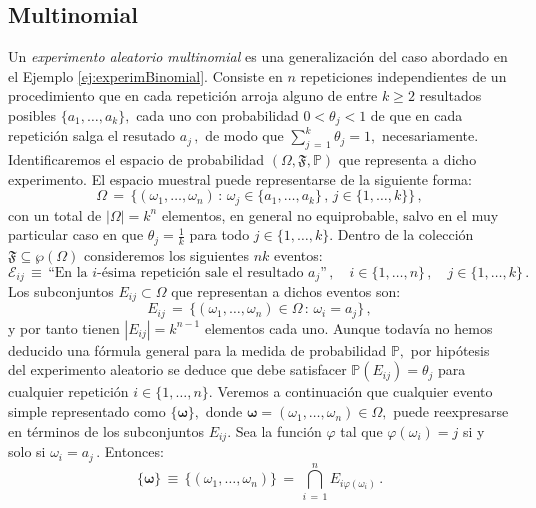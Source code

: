 \documentclass[spanish,10pt,letterpaper]{article}
\newcommand{\prob}{\mathbb{P}}
\begin{document}
\subsection{Multinomial}

Un \textit{experimento aleatorio multinomial} es una generalización del caso abordado en el Ejemplo \ref{ej:experimBinomial}. Consiste en $n$ repeticiones independientes de un procedimiento que en cada repetición arroja alguno de entre $k\geq 2$ resultados posibles $\{a_1,\ldots,a_k\},$ cada uno con probabilidad $0<\theta_j<1$ de que en cada repetición salga el resutado $a_j\,,$ de modo que $\sum_{j\,=\,1}^k\theta_j=1,$ necesariamente. Identificaremos el espacio de probabilidad $(\Omega,\mathfrak{F},\prob)$ que representa a dicho experimento. El espacio muestral puede representarse de la siguiente forma:
\begin{equation}
    \Omega \,=\, \big\{(\omega_1,\ldots,\omega_n)\,:\,\omega_j\in\{a_1,\ldots,a_k\}\,,\,j\in\{1,\ldots,k\}\big\}\,,  
\end{equation}
con un total de $|\Omega|=k^n$ elementos, en general no equiprobable, salvo en el muy particular caso en que $\theta_j=\frac{1}{k}$ para todo $j\in\{1,\ldots,k\}.$ Dentro de la colección $\mathfrak{F}\subseteq\wp(\Omega)$ consideremos los siguientes $nk$ eventos:
\begin{equation}
   \mathcal{E}_{ij} \,\equiv\, \text{``En la $i$-ésima repetición sale el resultado $a_j$''}\,,\quad i\in\{1,\ldots,n\}\,,\quad j\in\{1,\ldots,k\}\,.  
\end{equation}
Los subconjuntos $E_{ij}\subset\Omega$ que representan a dichos eventos son: 
\begin{equation}
  E_{ij} \,=\, \big\{(\omega_1,\ldots,\omega_n)\in \Omega\,:\,\omega_i=a_j\big\}\,,  
\end{equation}
y por tanto tienen $|E_{ij}|=k^{n-1}$ elementos cada uno. Aunque todavía no hemos deducido una fórmula general para la medida de probabilidad $\prob,$ por hipótesis del experimento aleatorio se deduce que debe satisfacer $\prob(E_{ij})=\theta_j$ para cualquier repetición $i\in\{1,\ldots,n\}.$ Veremos a continuación que cualquier evento simple representado como $\{\boldsymbol{\omega}\},$ donde $\boldsymbol{\omega}=(\omega_1,\ldots,\omega_n)\in\Omega,$ puede reexpresarse en términos de los subconjuntos $E_{ij}.$ Sea la función $\varphi$ tal que $\varphi(\omega_i)=j$ si y solo si $\omega_i=a_j\,.$ Entonces:
\begin{equation}
    \{\boldsymbol{\omega}\} \,\equiv\, \{(\omega_1,\ldots,\omega_n)\} \,=\, \bigcap_{i\,=\,1}^n E_{i\varphi(\omega_i)}\,.
\end{equation}
\end{document}
